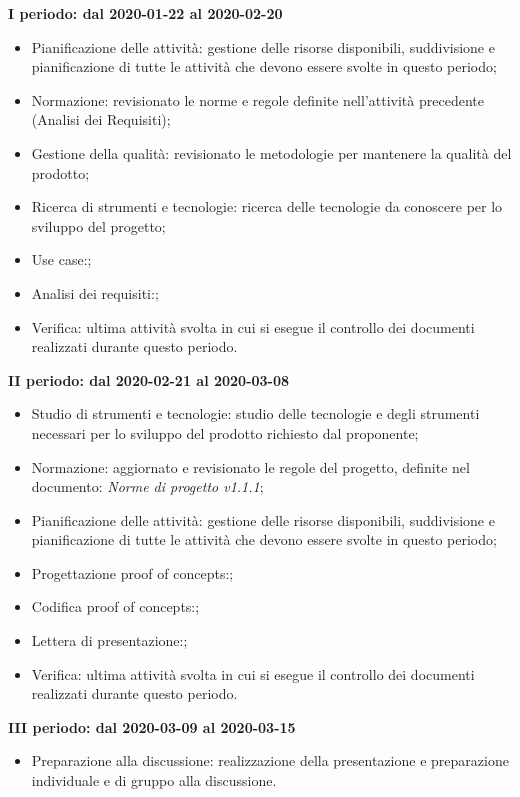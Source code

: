 \textbf{I periodo: dal 2020-01-22 al 2020-02-20}
\begin{itemize}
	\item Pianificazione delle attività: gestione delle risorse disponibili, suddivisione e pianificazione di tutte le attività che devono essere svolte in questo periodo;
	\item Normazione: revisionato le norme e regole definite nell'attività precedente (Analisi dei Requisiti);
	\item Gestione della qualità: revisionato le metodologie per mantenere la qualità del prodotto;
	\item Ricerca di strumenti e tecnologie: ricerca delle tecnologie da conoscere per lo sviluppo del progetto;
	\item Use case:; %
	\item Analisi dei requisiti:; %
	\item Verifica: ultima attività svolta in cui si esegue il controllo dei documenti realizzati durante questo periodo.
\end{itemize}

\textbf{II periodo: dal 2020-02-21 al 2020-03-08}
\begin{itemize}
	\item Studio di strumenti e tecnologie: studio delle tecnologie e degli strumenti necessari per lo sviluppo del prodotto richiesto dal proponente;
	\item Normazione: aggiornato e revisionato le regole del progetto, definite nel documento: \textit{Norme di progetto v1.1.1};
	\item Pianificazione delle attività: gestione delle risorse disponibili, suddivisione e pianificazione di tutte le attività che devono essere svolte in questo periodo;
	\item Progettazione proof of concepts:;
	\item Codifica proof of concepts:;
	\item Lettera di presentazione:;
	\item Verifica: ultima attività svolta in cui si esegue il controllo dei documenti realizzati durante questo periodo.
\end{itemize}

\textbf{III periodo: dal 2020-03-09 al 2020-03-15}
\begin{itemize}
	\item Preparazione alla discussione: realizzazione della presentazione e preparazione individuale e di gruppo alla discussione.
\end{itemize}

